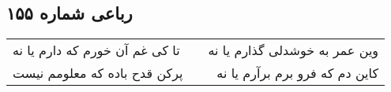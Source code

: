 \begin{center}
\section*{رباعی شماره ۱۵۵}
\label{sec:sh155}
\begin{longtable}{l p{0.5cm} r}
تا کی غم آن خورم که دارم یا نه
&&
وین عمر به خوشدلی گذارم یا نه
\\
پرکن قدح باده که معلومم نیست
&&
کاین دم که فرو برم برآرم یا نه
\\
\end{longtable}
\end{center}

